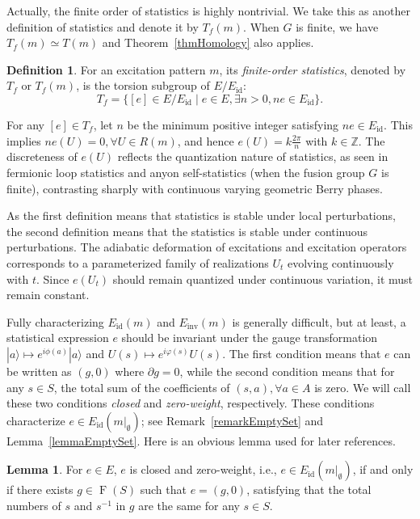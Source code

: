\documentclass[reprint, amsmath, amssymb, showpacs, floatfix, longbibliography, aps, twocolumn, superscriptaddress, nofootinbib]{revtex4-2}
\newcommand{\id}{{\operatorname{id}}}
\newcommand{\inv}{{\operatorname{inv}}}
\theoremstyle{definition}
\newtheorem{lemma}{Lemma}[section]
\newtheorem{definition}{Definition}[section]
\begin{document}
Actually, the finite order of statistics is highly nontrivial. We take this as another definition of statistics and denote it by $T_f(m)$. When $G$ is finite, we have $T_f(m)\simeq T(m)$ and Theorem~\ref{thmHomology} also applies.

\begin{definition}\label{defTf}
	For an excitation pattern $m$, its \textit{finite-order statistics}, denoted by $T_f$ or $T_f(m)$, is the torsion subgroup of $E/E_{\operatorname{id}}$: 
	\begin{equation}
		T_f = \{ [e] \in E/E_{\operatorname{id}} \mid e \in E, \exists n > 0, ne \in E_{\operatorname{id}} \}.
	\end{equation}
\end{definition}

For any $[e] \in T_f$, let $n$ be the minimum positive integer satisfying $ne \in E_{\operatorname{id}}$. This implies $ne(U)=0,\forall U\in R(m)$, and hence $e(U) = k \frac{2\pi}{n}$ with $k \in \mathbb{Z}$. The discreteness of $e(U)$ reflects the quantization nature of statistics, as seen in fermionic loop statistics and anyon self-statistics (when the fusion group $G$ is finite), contrasting sharply with continuous varying geometric Berry phases.

As the first definition means that statistics is stable under local perturbations, the second definition means that the statistics is stable under continuous perturbations. The adiabatic deformation of excitations and excitation operators corresponds to a parameterized family of realizations $U_t$ evolving continuously with $t$. Since $e(U_t)$ should remain quantized under continuous variation, it must remain constant.

Fully characterizing $E_\id(m)$ and $E_\inv(m)$ is generally difficult, but at least, a statistical expression $e$ should be invariant under the gauge transformation $|a\rangle\mapsto e^{i\phi(a)}|a\rangle$ and $U(s)\mapsto e^{i\varphi(s)}U(s)$. The first condition means that $e$ can be written as $(g,0)$ where $\partial g=0$, while the second condition means that for any $s\in S$, the total sum of the coefficients of $(s,a),\forall a\in A$ is zero. We will call these two conditions \textit{closed} and \textit{zero-weight}, respectively.
These conditions characterize $e\in E_\id(m|_\emptyset)$; see Remark~\ref{remarkEmptySet} and Lemma~\ref{lemmaEmptySet}. Here is an obvious lemma used for later references.

\begin{lemma}\label{lemmaClosedLoop}
	For $e\in E$,  $e$ is closed and zero-weight, i.e., $e\in E_\id(m|_\emptyset)$, if and only if there exists $g\in \operatorname{F}(S)$ such that $e=(g,0)$, satisfying that the total numbers of $s$ and $s^{-1}$ in $g$ are the same for any $s\in S$.
\end{lemma}
\end{document}
